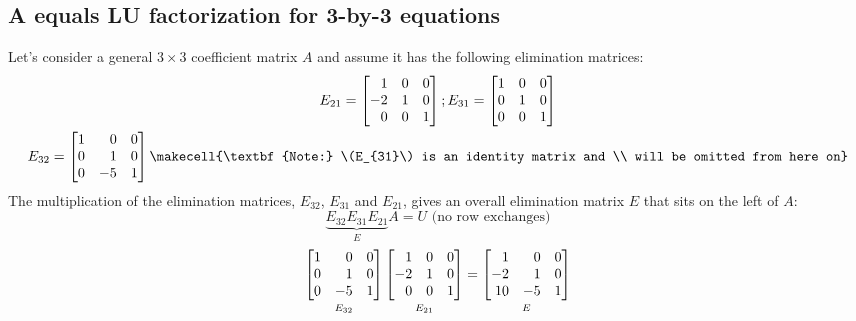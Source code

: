 \documentclass[../main.tex]{subfiles}
\begin{document}
\subsection{A equals LU factorization for 3-by-3 equations}
Let's consider a general \(3 \times 3\) coefficient matrix \(A\) and assume it has the following elimination matrices:
\[
    \begin{gathered}
        E_{21}
        =
        \begin{bmatrix*}[r]
            1 & 0 & 0 \\
            -2 & 1 & 0 \\
            0 & 0 & 1
        \end{bmatrix*};
        E_{31}
        =
        \begin{bmatrix*}[r]
            1 & 0 & 0 \\
            0 & 1 & 0 \\
            0 & 0 & 1
        \end{bmatrix*} \\
        E_{32}
        =
        \begin{bmatrix*}[r]
            1 & 0 & 0 \\
            0 & 1 & 0 \\
            0 & -5 & 1
        \end{bmatrix*}
        \text{\makecell{\textbf{Note:} \(E_{31}\) is an identity matrix and \\ will be omitted from here on}}
    \end{gathered}
\]
The multiplication of the elimination matrices, \(E_{32}\), \(E_{31}\) and \(E_{21}\), gives an overall elimination matrix \(E\) that sits on the left of \(A\):
\[
    \underbrace{E_{32}E_{31}E_{21}}_{E}A = U \text{ (no row exchanges)}
\]
\[
    \underbracket[0pt][0pt]{
        \begin{bmatrix*}[r]
            1 & 0 & 0 \\
            0 & 1 & 0 \\
            0 & -5 & 1
        \end{bmatrix*}
    }_{\mathstrut E_{32}}
    \underbracket[0pt][0pt]{
        \begin{bmatrix*}[r]
            1 & 0 & 0 \\
            -2 & 1 & 0 \\
            0 & 0 & 1
        \end{bmatrix*}
    }_{\mathstrut E_{21}}
    =
    \underbracket[0pt][0pt]{
        \begin{bmatrix*}[r]
            1 & 0 & 0 \\
            -2 & 1 & 0 \\
            10 & -5 & 1
        \end{bmatrix*}
    }_{\mathstrut E}
\]
\end{document}
